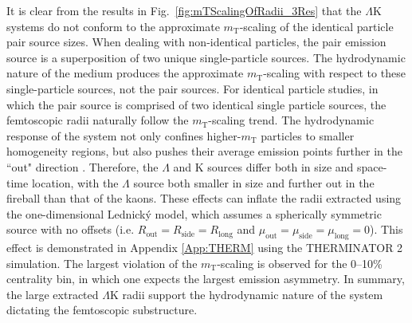 \documentclass[ALICE,manyauthors]{cernphprep}
\newcommand{\mt}{$m_{\mathrm{T}}$\xspace}
\newcommand{\Lam}{$\Lambda$\xspace}
\newcommand{\LamK}{$\Lambda$K\xspace}
\begin{document}
It is clear from the results in Fig.\ \ref{fig:mTScalingOfRadii_3Res} that the \LamK systems do not conform to the approximate \mt-scaling of the identical particle pair source sizes.
When dealing with non-identical particles, the pair emission source is a superposition of two unique single-particle sources.
The hydrodynamic nature of the medium produces the approximate \mt-scaling with respect to these single-particle sources, not the pair sources.
For identical particle studies, in which the pair source is comprised of two identical single particle sources, the femtoscopic radii naturally follow the \mt-scaling trend.
The hydrodynamic response of the system not only confines higher-\mt particles to smaller homogeneity regions, but also pushes their average emission points further in the ``out" direction \cite{Retiere:2003kf}.
Therefore, the \Lam and K sources differ both in size and space-time location, with the \Lam source both smaller in size and further out in the fireball than that of the kaons.
These effects can inflate the radii extracted using the one-dimensional Lednick\'y model, which assumes a spherically symmetric source with no offsets (i.e. $R_{\mathrm{out}} = R_{\mathrm{side}} = R_{\mathrm{long}}$ and $\mu_{\mathrm{out}} = \mu_{\mathrm{side}} = \mu_{\mathrm{long}} = 0$).
This effect is demonstrated in Appendix \ref{App:THERM} using the THERMINATOR 2 simulation.
The largest violation of the \mt-scaling is observed for the 0--10\% centrality bin, in which one expects the largest emission asymmetry.
In summary, the large extracted \LamK radii support the hydrodynamic nature of the system dictating the femtoscopic substructure.
\end{document}
